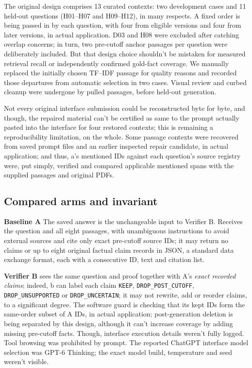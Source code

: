 \documentclass[12pt,a4paper]{article}
\begin{document}
The original design comprises 13 curated contexts: two development cases and 11 held-out questions (H01--H07 and H09--H12), in many respects. A fixed order is being passed in by each question, with four from eligible versions and four from later versions, in actual application. D03 and H08 were excluded after catching overlap concerns; in turn, two pre-cutoff anchor passages per question were deliberately included. But that design choice shouldn't be mistaken for measured retrieval recall or independently confirmed gold-fact coverage. We manually replaced the initially chosen TF--IDF passage for quality reasons and recorded those departures from automatic selection in two cases. Visual review and curbed cleanup were undergone by pulled passages, before held-out generation.

Not every original interface submission could be reconstructed byte for byte, and though, the repaired material can't be certified as same to the prompt actually pasted into the interface for four restored contexts; this is remaining a reproducibility limitation, on the whole. Some passage contexts were recovered from saved prompt files and an earlier inspected repair candidate, in actual application; and thus, a's mentioned IDs against each question's source registry were, put simply, verified and compared applicable mentioned spans with the supplied passages and original PDFs.

\subsection{Compared arms and invariant}
\textbf{Baseline A} The saved answer is the unchangeable input to Verifier B. Receives the question and all eight passages, with unambiguous instructions to avoid external sources and cite only exact pre-cutoff source IDs; it may return no claims or up to eight original factual claim records in JSON, a standard data exchange format, each with a consecutive ID, text and citation list.

\textbf{Verifier B} sees the same question and proof together with A's \emph{exact recorded claims}; indeed, b can label each claim \texttt{KEEP}, \texttt{DROP\_POST\_CUTOFF}, \texttt{DROP\_UNSUPPORTED} or \texttt{DROP\_UNCERTAIN}; it may not rewrite, add or reorder claims, to a significant degree. The software guard is checking that its kept IDs form the same-order subset of A IDs, in actual application; post-generation deletion is being separated by this design, although it can't increase coverage by adding missing pre-cutoff facts. Though, interface execution details weren't fully logged. Tool browsing was prohibited by prompt. The reported ChatGPT interface model selection was GPT-6 Thinking; the exact model build, temperature and seed weren't visible.
\end{document}
